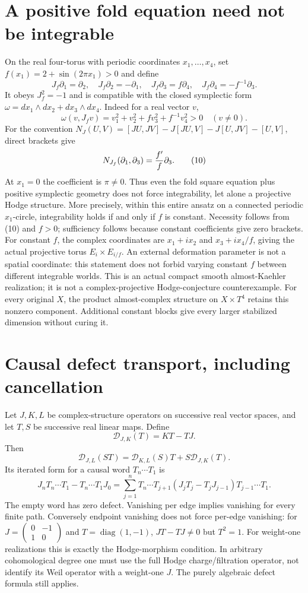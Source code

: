\documentclass[11pt]{article}
\begin{document}
\section{A positive fold equation need not be integrable}
On the real four-torus with periodic coordinates $x_1,\ldots,x_4$, set
$f(x_1)=2+\sin(2\pi x_1)>0$ and define
\[
 J_f\partial_1=\partial_2,\quad J_f\partial_2=-\partial_1,
 \quad J_f\partial_3=f\partial_4,\quad
 J_f\partial_4=-f^{-1}\partial_3.                \tag{8}
\]
It obeys $J_f^2=-1$ and is compatible with the closed symplectic form
$\omega=dx_1\wedge dx_2+dx_3\wedge dx_4$. Indeed for a real vector $v$,
\[
 \omega(v,J_fv)=v_1^2+v_2^2+fv_3^2+f^{-1}v_4^2>0
       \quad(v\ne0).                           \tag{9}
\]
For the convention
$N_J(U,V)=[JU,JV]-J[JU,V]-J[U,JV]-[U,V]$, direct brackets give
\[
 N_{J_f}(\partial_1,\partial_3)
       ={f'\over f}\partial_3.                 \tag{10}
\]
At $x_1=0$ the coefficient is $\pi\ne0$.
Thus even the fold square equation plus positive symplectic geometry
does not force integrability, let alone a projective Hodge structure.
More precisely, within this entire ansatz on a connected periodic
$x_1$-circle, integrability holds if and only if $f$ is constant.
Necessity follows from (10) and $f>0$; sufficiency follows because
constant coefficients give zero brackets. For constant $f$, the complex
coordinates are $x_1+i x_2$ and $x_3+i x_4/f$, giving the actual
projective torus $E_i\times E_{i/f}$. An external deformation parameter
is not a spatial coordinate: this statement does not forbid varying
constant $f$ between different integrable worlds.
This is an actual compact smooth almost-Kaehler realization; it is not
a complex-projective Hodge-conjecture counterexample. For every original
$X$, the product almost-complex structure on $X\times T^4$ retains this
nonzero component. Additional constant blocks give every larger
stabilized dimension without curing it.

\section{Causal defect transport, including cancellation}
Let $J,K,L$ be complex-structure operators on successive real vector
spaces, and let $T,S$ be successive real linear maps. Define
\[
 \mathcal D_{J,K}(T)=KT-TJ.
\]
Then
\[
 \mathcal D_{J,L}(ST)
 =\mathcal D_{K,L}(S)T+S\mathcal D_{J,K}(T).      \tag{11}
\]
Its iterated form for a causal word $T_n\cdots T_1$ is
\[
 J_nT_n\cdots T_1-T_n\cdots T_1J_0
 =\sum_{j=1}^n T_n\cdots T_{j+1}
       (J_jT_j-T_jJ_{j-1})T_{j-1}\cdots T_1.     \tag{12}
\]
The empty word has zero defect. Vanishing per edge implies vanishing
for every finite path. Conversely endpoint vanishing does not force
per-edge vanishing: for $J=\left(\begin{smallmatrix}0&-1\\1&0\end{smallmatrix}\right)$
and $T=\operatorname{diag}(1,-1)$, $JT-TJ\ne0$ but $T^2=1$.
For weight-one realizations this is exactly the Hodge-morphism
condition. In arbitrary cohomological degree one must use the full
Hodge charge/filtration operator, not identify its Weil operator with
a weight-one $J$. The purely algebraic defect formula still applies.
\end{document}
